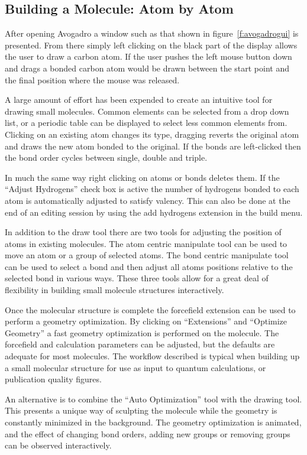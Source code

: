 \documentclass{article}
\begin{document}
\subsection{Building a Molecule: Atom by Atom}

After opening Avogadro a window such as that shown in figure~\ref{f:avogadrogui} is presented. From there simply left clicking on the black part of the display allows the user to draw a carbon atom. If the user pushes the left mouse button down and drags a bonded carbon atom would be drawn between the start point and the final position where the mouse was released.

A large amount of effort has been expended to create an intuitive tool for drawing small molecules. Common elements can be selected from a drop down list, or a periodic table can be displayed to select less common elements from. Clicking on an existing atom changes its type, dragging reverts the original atom and draws the new atom bonded to the original. If the bonds are left-clicked then the bond order cycles between single, double and triple.

In much the same way right clicking on atoms or bonds deletes them. If the ``Adjust Hydrogens'' check box is active the number of hydrogens bonded to each atom is automatically adjusted to satisfy valency. This can also be done at the end of an editing session by using the add hydrogens extension in the build menu.

In addition to the draw tool there are two tools for adjusting the position of atoms in existing molecules. The atom centric manipulate tool can be used to move an atom or a group of selected atoms. The bond centric manipulate tool can be used to select a bond and then adjust all atoms positions relative to the selected bond in various ways. These three tools allow for a great deal of flexibility in building small molecule structures interactively.

Once the molecular structure is complete the forcefield extension can be used to perform a geometry optimization. By clicking on ``Extensions'' and ``Optimize Geometry'' a fast geometry optimization is performed on the molecule. The forcefield and calculation parameters can be adjusted, but the defaults are adequate for most molecules. The workflow described is typical when building up a small molecular structure for use as input to quantum calculations, or publication quality figures.

An alternative is to combine the ``Auto Optimization'' tool with the drawing tool. This presents a unique way of sculpting the molecule while the geometry is constantly minimized in the background. The geometry optimization is animated, and the effect of changing bond orders, adding new groups or removing groups can be observed interactively.
\end{document}
